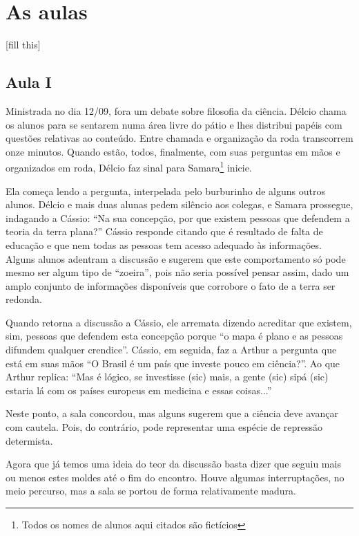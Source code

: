 \documentclass[12pt,a4paper]{article}
\begin{document}
	\newpage
	
	\section{As aulas}
	
	[fill this]

    \subsection*{Aula I}
    
    Ministrada no dia 12/09, fora um debate sobre filosofia da ciência. Délcio 
    chama os alunos para se sentarem numa área livre do pátio e lhes distribui 
    papéis com questões relativas ao conteúdo. Entre chamada e organização da 
    roda transcorrem onze minutos. Quando estão, todos, finalmente, com suas 
    perguntas em mãos e organizados em roda, Délcio faz sinal para 
    Samara\footnote{Todos os nomes de alunos aqui citados são fictícios} 
    inicie. 
    
    Ela começa lendo a pergunta, interpelada pelo burburinho de alguns 
    outros alunos. Délcio e mais duas alunas pedem silêncio aos colegas, e 
    Samara prossegue, indagando a Cássio: ``Na sua concepção, por que existem 
    pessoas que defendem a teoria da terra plana?'' Cássio responde citando 
    que é resultado de falta de educação e que nem todas as pessoas tem acesso 
    adequado às informações. Alguns alunos adentram a discussão e sugerem que 
    este comportamento só pode mesmo ser algum tipo de ``zoeira'', pois não 
    seria possível pensar assim, dado um amplo conjunto de informações 
    disponíveis que corrobore o fato de a terra ser redonda. 
    
    Quando retorna a discussão a Cássio, ele arremata dizendo acreditar que 
    existem, sim, pessoas que defendem esta concepção porque ``o mapa é plano 
    e as pessoas difundem qualquer crendice''. Cássio, em seguida, faz a 
    Arthur a pergunta que está em suas mãos ``O Brasil é um país que 
    investe pouco em ciência?''. Ao que Arthur replica: ``Mas é lógico, 
    se investisse (sic) mais, a gente (sic) sipá (sic) estaria lá com os 
    países europeus em medicina e essas coisas...'' 
    
    Neste ponto, a sala concordou, mas alguns sugerem que a ciência deve 
    avançar com cautela. Pois, do contrário, pode representar uma espécie de 
    repressão determista. 
    
    Agora que já temos uma ideia do teor da discussão basta dizer que seguiu 
    mais ou menos estes moldes até o fim do encontro. Houve algumas 
    interruptações, no meio percurso, mas a sala se portou de forma 
    relativamente madura. 
\end{document}
